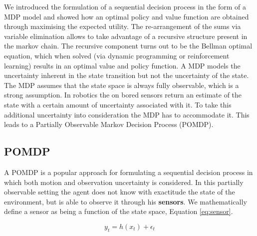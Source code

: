 We introduced the formulation of a sequential decision process in the form of a MDP model and showed how an optimal policy 
and value function are obtained through maximising the expected utility. The re-arrangement of the sums via
variable elimination allows to take advantage of a recursive structure present in the markov chain. The recursive component 
turns out to be the Bellman optimal equation, which when solved (via dynamic programming or reinforcement learning) results 
in an optimal value and policy function. A MDP models the uncertainty inherent in the state transition but not the uncertainty 
of the state. The MDP assumes that the state space is always fully observable, which is a strong assumption. In robotics the 
on bored sensors return an estimate of the state with a certain amount of uncertainty associated with it. To take this additional
uncertainty into consideration the MDP has to accommodate it. This leads to a Partially Observable Markov Decision Process (POMDP).

\subsection{POMDP}

A POMDP is a popular approach for formulating a sequential decision process in which both motion and observation 
uncertainty is considered. In this partially observable setting the agent does not know with exactitude the state of the environment,
but is able to observe it through his \textbf{sensors}. We mathematically define a sensor as being a function of the 
state space, Equation \ref{eq:sensor}.

\begin{equation}\label{eq:sensor}
  y_t = h(x_t) + \epsilon_t
\end{equation}

